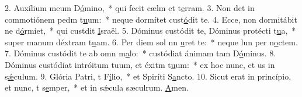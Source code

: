 2. Auxílium meum  D\uline{ó}mino,~* qui fecit cælm et t\uline{e}rram.
3. Non det in commotiónem pedm t\uline{u}um:~* neque dormítet  cust\uline{ó}dit te.
4. Ecce, non dormitábit ne d\uline{ó}rmiet,~* qui custdit \uline{I}sraël.
5. Dóminus custódit te, Dóminus protécti t\uline{u}a,~* super manum déxtram t\uline{u}am.
6. Per diem sol nn \uline{u}ret te:~* neque lun per n\uline{o}ctem.
7. Dóminus custódit te ab omn m\uline{a}lo:~* custódiat ánimam tam D\uline{ó}minus.
8. Dóminus custódiat intróitum tuum, et éxitm t\uline{u}um:~* ex hoc nunc, et us in s\uline{ǽ}culum.
9. Glória Patri, t F\uline{í}lio,~* et Spiríti S\uline{a}ncto.
10. Sicut erat in princípio, et nunc, t s\uline{e}mper,~* et in sǽcula sæculrum. \uline{A}men.

